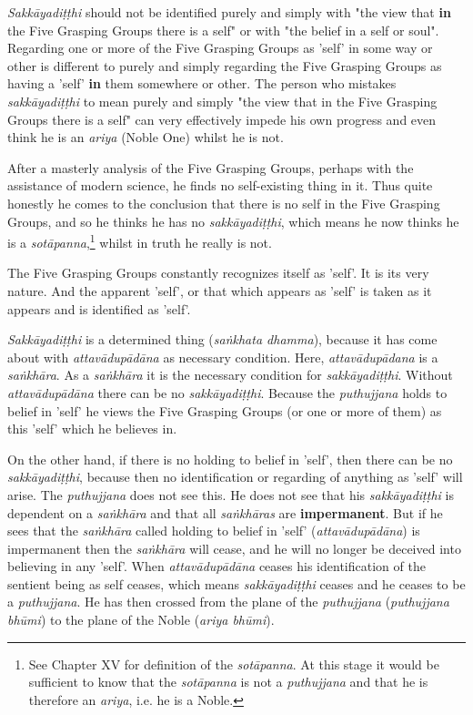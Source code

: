 \emph{Sakkāyadiṭṭhi} should not be identified purely and simply with "the
view that \textbf{in} the Five Grasping Groups there is a self" or with "the
belief in a self or soul". Regarding one or more of the Five Grasping
Groups as 'self' in some way or other is different to purely and simply
regarding the Five Grasping Groups as having a 'self' \textbf{in} them somewhere
or other. The person who mistakes \emph{sakkāyadiṭṭhi} to mean purely and
simply "the view that in the Five Grasping Groups there is a self" can
very effectively impede his own progress and even think he is an \emph{ariya}
(Noble One) whilst he is not.


After a masterly analysis of the Five
Grasping Groups, perhaps with the assistance of modern science, he finds
no self-existing thing in it. Thus quite honestly he comes to the
conclusion that there is no self in the Five Grasping Groups, and so he
thinks he has no \emph{sakkāyadiṭṭhi}, which means he now thinks he is a
\emph{sotāpanna},\footnote{See Chapter XV for definition of the \emph{sotāpanna}. At this stage it would be sufficient to know that the \emph{sotāpanna} is not a \emph{puthujjana} and that he is therefore an \emph{ariya}, i.e. he is a Noble.} whilst in truth he really is not.


The Five Grasping Groups constantly recognizes itself as 'self'. It is
its very nature. And the apparent 'self', or that which appears as
'self' is taken as it appears and is identified as 'self'.


\emph{Sakkāyadiṭṭhi} is a determined thing (\emph{saṅkhata dhamma}), because it
has come about with \emph{attavādupādāna} as necessary condition. Here,
\emph{attavādupādana} is a \emph{saṅkhāra}. As a \emph{saṅkhāra} it is the necessary
condition for \emph{sakkāyadiṭṭhi}. Without \emph{attavādupādāna} there can be
no \emph{sakkāyadiṭṭhi}. Because the \emph{puthujjana} holds to belief in 'self'
he views the Five Grasping Groups (or one or more of them) as this
'self' which he believes in.


On the other hand, if there is no holding to belief in 'self', then
there can be no \emph{sakkāyadiṭṭhi}, because then no identification or
regarding of anything as 'self' will arise. The \emph{puthujjana} does not
see this. He does not see that his \emph{sakkāyadiṭṭhi} is dependent on a
\emph{saṅkhāra} and that all \emph{saṅkhāras} are \textbf{impermanent}. But if he sees
that the \emph{saṅkhāra} called holding to belief in 'self'
(\emph{attavādupādāna}) is impermanent then the \emph{saṅkhāra} will cease, and
he will no longer be deceived into believing in any 'self'. When
\emph{attavādupādāna} ceases his identification of the sentient being as self
ceases, which means \emph{sakkāyadiṭṭhi} ceases and he ceases to be a
\emph{puthujjana}. He has then crossed from the plane of the \emph{puthujjana}
(\emph{puthujjana bhūmi}) to the plane of the Noble (\emph{ariya bhūmi}).


